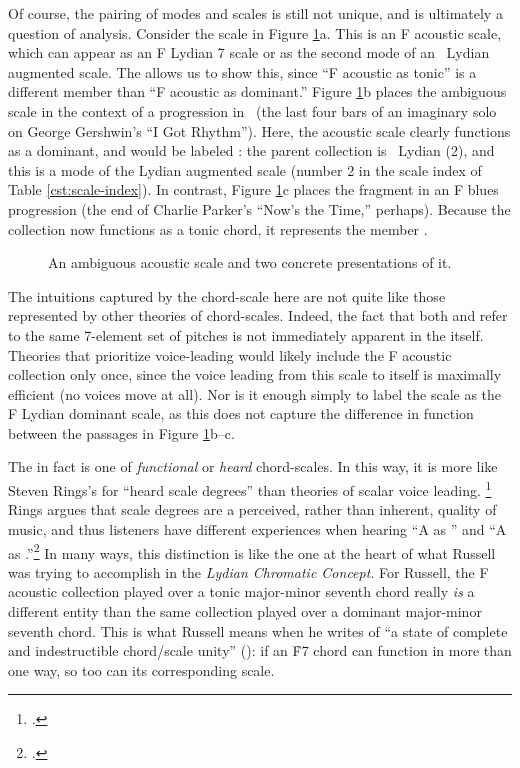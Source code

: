 Of course, the pairing of modes and scales is still not unique, and is
ultimately a question of analysis. Consider the scale in Figure
\ref{cst:ambiguous-acoustic}a. This is an F acoustic scale, which can appear
as an F Lydian \flat{}7 scale or as the second mode of an \Eflat\ Lydian
augmented scale. The \gis allows us to show this, since ``F
acoustic as tonic'' is a different \gis member than ``F acoustic as
dominant.'' Figure \ref{cst:ambiguous-acoustic}b places the ambiguous scale in
the context of a \tfo progression in \Bflat\ (the last four bars of an
imaginary solo on George Gershwin's ``I Got Rhythm''). Here, the acoustic
scale clearly functions as a dominant, and would be labeled
: the parent collection is \Eflat\ Lydian
(2\flat), and this is a mode of the Lydian augmented scale (number 2 in the
scale index of Table \ref{cst:scale-index}). In contrast, Figure
\ref{cst:ambiguous-acoustic}c places the fragment in an F blues \tfo
progression (the end of Charlie Parker's ``Now's the Time,'' perhaps). Because
the collection now functions as a tonic chord, it represents the \gis member
.

\begin{figure}[tbp]
  \caption{An ambiguous acoustic scale and two concrete presentations of it.}
  \label{cst:ambiguous-acoustic}
\end{figure}

The intuitions captured by the chord-scale \gis here are not quite like those
represented by other theories of chord-scales. Indeed, the fact that both
 and  refer to
the same 7-element set of pitches is not immediately apparent in the \gis itself.
Theories that prioritize voice-leading would likely include the F acoustic
collection only once, since the voice leading from this scale to itself is
maximally efficient (no voices move at all). Nor is it enough simply to label
the scale as the F Lydian dominant scale, as this does not capture the
difference in function between the passages in Figure
\ref{cst:ambiguous-acoustic}b--c.

The \gis in fact is one of \emph{functional} or \emph{heard} chord-scales. In
this way, it is more like Steven Rings's \gis for ``heard scale degrees'' than
theories of scalar voice leading. \footcite[44--50 and throughout]{rings:2011}
Rings argues that scale degrees are a perceived, rather than inherent, quality
of music, and thus listeners have different experiences when hearing ``A as
'' and ``A as .''\footcite[42]{rings:2011} In many ways, this
distinction is like the one at the heart of what Russell was trying to
accomplish in the \emph{Lydian Chromatic Concept}. For Russell, the F acoustic
collection played over a tonic major-minor seventh chord really \emph{is} a
different entity than the same collection played over a dominant major-minor
seventh chord. This is what Russell means when he writes of ``a state of
complete and indestructible chord/scale unity'' (): if an \h{F7} chord
can function in more than one way, so too can its corresponding scale.

